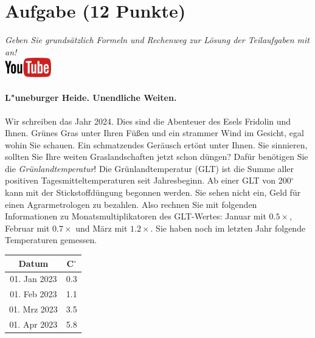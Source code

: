 \documentclass[a4paper, 9pt]{scrartcl}\usepackage[]{graphicx}\usepackage[]{xcolor}
\begin{document}
\clearpage

\section{Aufgabe \hfill (12 Punkte)}

\textit{Geben Sie grunds{\"a}tzlich Formeln und Rechenweg zur L{\"o}sung der
  Teilaufgaben mit an!} \\[1Ex]

\hfill\href{https://youtu.be/fiWGgCX-cE4}{\includegraphics[width =
  2cm]{img/youtube}} %
\hspace{2Ex}



\paragraph{L{"u}neburger Heide. Unendliche Weiten.}



Wir schreiben das Jahr 2024. Dies sind die Abenteuer
des Esels Fridolin und Ihnen. Gr{\"u}nes Gras unter Ihren F{\"u}{\ss}en und
ein strammer Wind im Gesicht, egal wohin Sie schauen. Ein schmatzendes
Ger{\"a}usch ert{\"o}nt unter Ihnen. Sie sinnieren, sollten Sie Ihre weiten
Graslandschaften jetzt schon d{\"u}ngen?  Daf{\"u}r ben{\"o}tigen Sie die
\textit{Gr{\"u}nlandtemperatur}! Die Gr{\"u}nlandtemperatur (GLT) ist die Summe aller
positiven Tagesmitteltemperaturen seit Jahresbeginn. Ab einer GLT von
200$^\circ$ kann mit der Stickstoffd{\"u}ngung begonnen werden. Sie sehen nicht
ein, Geld f{\"u}r einen Agrarmetrologen zu bezahlen. Also rechnen Sie mit
folgenden Informationen zu Monatsmultiplikatoren des GLT-Wertes: Januar mit
$0.5\times$, Februar mit $0.7\times$ und M{\"a}rz mit
$1.2\times$. Sie haben noch im letzten Jahr folgende Temperaturen
gemessen.

\begin{center}
\begin{tabular}{cc}
  \toprule
  Datum & C$^\circ$ \\
  \midrule
  01. Jan 2023 & 0.3\\
  01. Feb 2023 & 1.1\\
  01. Mrz 2023 & 3.5\\
  01. Apr 2023 & 5.8\\
  \bottomrule
\end{tabular}
\end{center}
\end{document}
